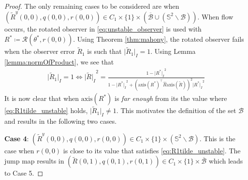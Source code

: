 \documentclass{article}
\newcommand{\axis}[1]{\text{axis}(#1)}
\newcommand{\brackets}[1]{\left(#1\right)}
\newcommand{\Rtilde}{\tilde{R}}
\newcommand{\normSOthree}[1]{{{\vert}#1 {\vert}_I}}
\newcommand{\Rstar}{{R^*}}
\begin{document}
\begin{proof}
    The only remaining cases to be considered are when $(\Rtilde^y(0,0), q(0,0), r(0,0))\in C_1\times\{1\}\times (\overline{\mathcal{B}} \cup (\mathbb{S}^2\backslash \mathcal{B}))$. When flow occurs, the rotated observer in \eqref{eq:unstable_observer} is used with $\Rstar\coloneqq \mathcal{R}(\theta^*, r(0,0))$. Using Theorem \ref{thm:mahony}, the rotated observer fails when the observer error $\Rtilde_1$ is such that $\normSOthree{\Rtilde_1}=1$. Using Lemma \ref{lemma:normOfProduct}, we see that 
    \begin{align}
        \normSOthree{{\Rtilde_1}} = 1 \iff \normSOthree{\Rtilde}^2 = \frac{1 - \normSOthree{\Rstar}^2}{1 - \normSOthree{\Rstar}^2 + \brackets{\axis{\Rstar}^\top\hat{R}\axis{\Rtilde}}^2\normSOthree{\Rstar}^2} \label{eq:R1tilde_unstable}
    \end{align}
    It is now clear that when $\axis{\Rstar}$ is \emph{far enough} from its the value where \eqref{eq:R1tilde_unstable} holds,  $\normSOthree{\Rtilde_1}\neq 1$. This motivates the definition of the set $\mathcal{B}$ and results in the following two cases.

\textbf{Case 4}: ${(\Rtilde^y(0,0), q(0,0), r(0,0))}\in C_1\times\{1\}\times (\mathbb{S}^2\backslash \mathcal{B})$. This is the case when $r(0,0)$ is close to its value that satisfies \eqref{eq:R1tilde_unstable}. The jump map results in $(\Rtilde(0,1), q(0,1), r(0,1))\in C_1\times \{1\}\times \overline{\mathcal{B}}$ which leads to Case 5. 


\end{proof}
\end{document}
